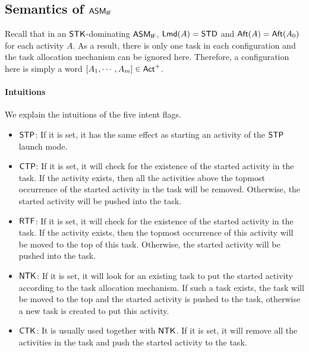

\subsection{Semantics of $\textsf{ASM}_\textsf{IF}$} \label{subsect:semifamass}



Recall that in an  $\mathsf{STK}$-dominating  $\textsf{ASM}_\textsf{IF}$, ${\sf Lmd}(A) = \mathsf{STD}$ and ${\sf Aft}(A) = {\sf Aft}(A_0)$ for each activity $A$. As a result, there is only one task in each configuration and the task allocation mechanism can be ignored here. Therefore, a configuration here is simply a word $[A_1,\cdots,A_m]\in{\sf Act}^+$. 


\paragraph{Intuitions}  We explain the intuitions of the five intent flags. 
\begin{itemize}
	\item ${\sf STP}$:  If it is set,  it has the same effect as starting an activity of the $\mathsf{STP}$ launch mode.
	\item ${\sf CTP}$:  If it is set, it will check for the existence of the started activity in the task. If the activity exists, then all the activities above the topmost occurrence of the started activity in the task will be removed. Otherwise, the started activity will be pushed into the task.
	\item ${\sf RTF}$:  If it is set, it will check for the existence of the started activity in the task. If the activity exists, then the topmost occurrence of this activity will be moved to the top of this task. Otherwise, the started activity will be pushed into the task.
	\item ${\sf NTK}$:  If it is set, it will look for an existing task to put the started activity according to the task allocation mechanism. If such a task exists, the task will be moved to the top and the started activity is pushed to the task, otherwise a new task is created to put this activity.
	\item ${\sf CTK}$: It is usually used together with ${\sf NTK}$. If it is set, it will remove all the activities in the task and push the started activity to the task.
\end{itemize}

